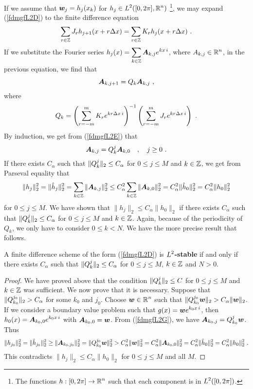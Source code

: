 If we assume that $\displaystyle \bm{w}_j = h_j(x_k)$ for
$\displaystyle h_j \in L^2([0,2\pi],\mathbb{R}^n)$ \footnote{The functions
$\displaystyle h:[0,2\pi] \to \mathbb{R}^n$ such that each component is in
$\displaystyle L^2([0,2\pi])$.},
we may expand (\ref{fdmgfL2D}) to the finite difference equation
\begin{equation}\label{fdmgfL2F}
\sum_{r\in \mathbb{Z}} J_r h_{j+1}(x+r\Delta{x}) =
\sum_{r\in \mathbb{Z}} K_r h_j(x+r\Delta{x}) \ .
\end{equation}
If we substitute the Fourier series
$\displaystyle h_j(x) = \sum_{k\in \mathbb{Z}} \bm{A}_{k,j} e^{k x\, i}$,
where $\displaystyle A_{k,j} \in \mathbb{R}^n$, in the previous equation, we find that
\begin{equation}\label{fdmgfL2E}
  \bm{A}_{k,j+1} = Q_k \bm{A}_{k,j} \ ,
\end{equation}
where
\[
  Q_k = \left( \sum_{r=-m}^m K_r e^{k r \Delta{x}\, i} \right)^{-1}
  \left( \sum_{r=-m}^m J_r  e^{k r \Delta{x}\, i} \right) \ .
\]
By induction, we get from (\ref{fdmgfL2E}) that
\begin{equation}\label{fdmgfL2G}
\bm{A}_{k,j} = Q_k^j \bm{A}_{k,0} \quad , \quad j \geq 0 \ .
\end{equation}
If there exists $C_\alpha$ such that
$\displaystyle \|Q_k^j\|_2 \leq C_\alpha$ for
$0\leq j \leq M$ and $k \in \mathbb{Z}$,  we get from Parseval equality that
\[
  \|h_j\|_2^2 = \|\hat{h}_j \|_2^2
  = \sum_{k\in \mathbb{Z}} \|\bm{A}_{k,j}\|_2^2
\leq C_\alpha^2 \sum_{k\in \mathbb{Z}} \|\bm{A}_{k,0}\|_2^2
= C_\alpha^2 \|\hat{h}_0 \|_2^2 = C_\alpha^2\|h_0\|_2^2
\]
for $0 \leq j \leq M$.  We have shown that $\|h_j\|_2 \leq C_\alpha \|h_0\|_2$
if there exists $C_\alpha$ such that
$\displaystyle \|Q_k^j\|_2 \leq C_\alpha$ for
$0\leq j \leq M$ and $k \in \mathbb{Z}$.   Again, because of the periodicity
of $Q_k$, we only have to consider $0 \leq k <N$.  We have the more
precise result that follows.

\begin{prop}
A finite difference scheme of the form (\ref{fdmgfL2D}) is
{\bfseries $\displaystyle L^2$-stable} if and only if there exists
$C_\alpha$ such that $\displaystyle \|Q_k^j\|_2 \leq C_\alpha$ for
$0\leq j \leq M$, $k \in \mathbb{Z}$ and $N>0$.
\label{QkjCstable}
\end{prop}

\begin{proof}
We have proved above that the condition $\displaystyle \|Q_k^j\|_2 \leq C$ for
$0\leq j \leq M$ and $k \in \mathbb{Z}$ was sufficient.   We now prove that
it is necessary.  Suppose that $\displaystyle \|Q_{k_0}^{j_0}\|_2 > C_\alpha$ for
some $k_0$ and $j_0$.  Choose $\displaystyle \bm{w} \in \mathbb{R}^n$ such that
$\displaystyle \|Q_{k_0}^{j_0}\bm{w}\|_2 > C_\alpha \|\bm{w}\|_2$.
If we consider a boundary value problem
such that $\displaystyle g(x) = \bm{w} e^{k_0 x\, i}$, then
$\displaystyle h_0(x) = \bm{A}_{k_0,0} e^{k_0 x\, i}$ with
$\bm{A}_{k_0,0} = \bm{w}$.  From (\ref{fdmgfL2G}), we have
$\displaystyle \bm{A}_{k_0,j} = Q_{k_0}^j\bm{w}$.   Thus
\[
\|h_{j_0}\|_2^2 = \|\hat{h}_{j_0}\|_2^2 \geq \|\bm{A}_{k_0,j_0}\|_2^2
= \| Q_{k_0}^{j_0} \bm{w} \|_2^2
> C_\alpha^2 \|\bm{w}\|_2^2 = C_\alpha^2 \|\bm{A}_{k_0,0}\|_2^2
= C_\alpha^2 \|\hat{h}_0\|_2^2 = C_\alpha^2 \|h_0\|_2^2 \ .
\]
This contradicts $\|h_j\|_2 \leq C_\alpha \|h_0\|_2$ for
$0 \leq j \leq M$ and all $M$.
\end{proof}

